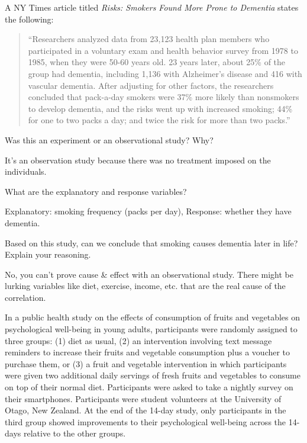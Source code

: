 \documentclass[12pt]{exam}
\newcounter{countA}
\begin{document}
\begin{questions}
\setcounter{question}{\value{countA}}
\item A NY Times article titled \emph{Risks: Smokers Found More Prone to Dementia} states the following:

\begin{quote}
``Researchers analyzed data from 23,123 health plan members who
participated in a voluntary exam and health behavior survey from 1978 to
1985, when they were 50-60 years old. 23 years later, about 25\% of the
group had dementia, including 1,136 with Alzheimer's disease and 416
with vascular dementia. After adjusting for other factors, the
researchers concluded that pack-a-day smokers were 37\% more likely than
nonsmokers to develop dementia, and the risks went up with increased
smoking; 44\% for one to two packs a day; and twice the risk for more
than two packs.''
\end{quote}

\begin{parts}
\item
  Was this an experiment or an observational study? Why?
\begin{solution}
It's an observation study because there was no treatment imposed on the individuals. 
\end{solution}
\vfill
\item
  What are the explanatory and response variables?
\begin{solution}
Explanatory: smoking frequency (packs per day), Response: whether they have dementia.
\end{solution}
\vfill
\item
  Based on this study, can we conclude that smoking causes dementia
  later in life? Explain your reasoning.
\vfill
\begin{solution}
No, you can't prove cause \& effect with an observational study. There might be lurking variables like diet, exercise, income, etc. that are the real cause of the correlation. 
\end{solution}
\end{parts}


\question
  In a public health study on the effects of consumption of fruits and
  vegetables on psychological well-being in young adults, participants
  were randomly assigned to three groups: (1) diet as usual, (2) an
  intervention involving text message reminders to increase their fruits
  and vegetable consumption plus a voucher to purchase them, or (3) a
  fruit and vegetable intervention in which participants were given two
  additional daily servings of fresh fruits and vegetables to consume on
  top of their normal diet. Participants were asked to take a nightly
  survey on their smartphones. Participants were student volunteers at
  the University of Otago, New Zealand. At the end of the 14-day study,
  only participants in the third group showed improvements to their
  psychological well-being across the 14-days relative to the other
  groups.


\end{questions}
\end{document}
